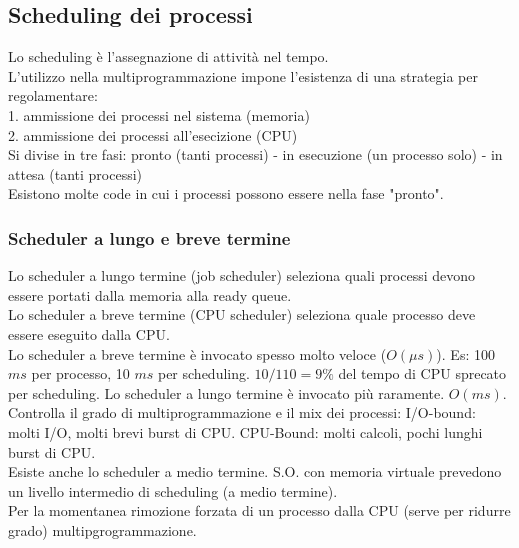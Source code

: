 \documentclass{article}
\begin{document}
\subsection*{Scheduling dei processi}
Lo scheduling \`{e} l'assegnazione di attivit\`{a} nel tempo.\\
L'utilizzo nella multiprogrammazione impone l'esistenza di una strategia per regolamentare:\\
1. ammissione dei processi nel sistema (memoria)\\
2. ammissione dei processi all'esecizione (CPU)\\
Si divise in tre fasi: pronto (tanti processi) - in esecuzione (un processo solo) - in attesa (tanti processi)\\
Esistono molte code in cui i processi possono essere nella fase "pronto".\\
\subsubsection*{Scheduler a lungo e breve termine}
Lo scheduler a lungo termine (job scheduler) seleziona quali
processi devono essere portati dalla memoria alla ready queue.\\
Lo scheduler a breve termine (CPU scheduler) seleziona quale processo
deve essere eseguito dalla CPU.\\
Lo scheduler a breve termine \`{e} invocato spesso molto veloce ($O(\mu s)$).
Es: 100 $ms$ per processo, 10 $ms$ per scheduling. $10/110=9\%$ del tempo
di CPU sprecato per scheduling.
Lo scheduler a lungo termine \`{e} invocato pi\`{u} raramente.
$O(ms)$. Controlla il grado di multiprogrammazione e il mix
dei processi: I/O-bound: molti I/O, molti brevi burst di CPU.
CPU-Bound: molti calcoli, pochi lunghi burst di CPU.\\
Esiste anche lo scheduler a medio termine. S.O. con memoria virtuale prevedono un livello
intermedio di scheduling (a medio termine).\\
Per la momentanea rimozione forzata di un processo dalla CPU (serve per ridurre grado)
multipgrogrammazione.
\end{document}
